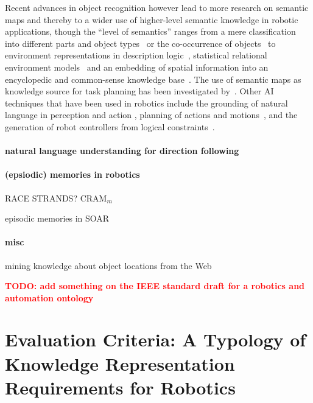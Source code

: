 \documentclass[journal]{IEEEtran}
\newcommand{\todo}[1]{\textbf{\textcolor{red}{TODO: #1}}}
\begin{document}
Recent advances in object recognition however lead to more research on semantic
maps and thereby to a wider use of higher-level semantic knowledge in robotic
applications, though the ``level of semantics'' ranges from a  mere  classification
into different parts and object types~\cite{Rusu08RAS2} or the co-occurrence of
objects~\cite{vasudevan08} to environment representations in description
logic~\cite{zender2008conceptual}, statistical relational environment
models~\cite{limketkai05relational} and an embedding of spatial information
into an encyclopedic and common-sense knowledge base~\cite{tenorth10envmodel}.
The use of semantic maps as knowledge source for task planning has been
investigated by~\cite{galindo08taskplanning}. Other AI techniques that have
been used in robotics include the grounding of natural language in perception
and action \cite{Mavridis2006,kollar10natural}, planning of actions and
motions~\cite{wolfe10combined,kaelbling11planning}, and the generation of
robot controllers from logical constraints~\cite{kressgazit09planning}.

\paragraph{natural language understanding for direction following}
\cite{matuszek12commands}
\cite{duvallet13imitation}


\paragraph{(epsiodic) memories in robotics}

RACE \cite{rockel13ontology}
STRANDS?
CRAM$_m$ \cite{winkler13memory}

episodic memories in SOAR~\cite{nuxoll12episodic}

\paragraph{misc}
mining knowledge about object locations from the Web
\cite{zhou12webmining}



\todo{add something on the IEEE standard draft for a robotics and automation ontology}


\section{Evaluation Criteria: A Typology of Knowledge Representation Requirements for Robotics}
\label{sect|features}
\end{document}
